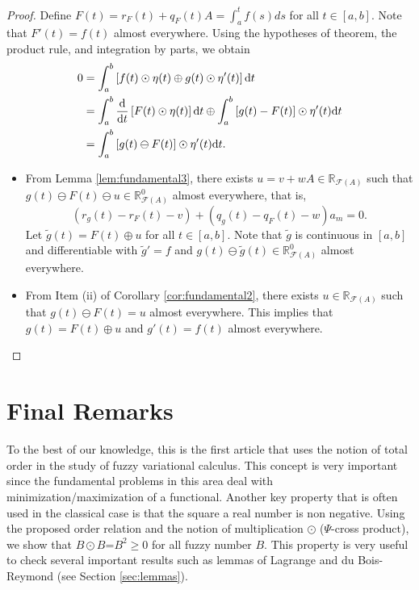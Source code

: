 \documentclass[12pt,a4paper]{article}
\newcommand{\RFA}{\mathbb{R}_{\mathcal{F}(A)}}
\begin{document}
\begin{proof}
Define $F(t) = r_F(t) + q_F(t)A = \int_a^t f(s)ds$ for all $t \in [a,b].$  
Note that $F'(t)=f(t)$ almost everywhere. Using the hypotheses of theorem, the product rule, and integration by parts, we obtain 
\begin{align*}
0&=\int_{a}^{b}\left[f(t)\odot\eta(t) \oplus g(t) \odot \eta'(t)\right]\textnormal{d}t\\
&=\int_{a}^{b}\dfrac{\textnormal{d}}{\textnormal{d}t}\left[F(t)\odot\eta(t)\right]\textnormal{d}t \oplus \int_{a}^{b}\left[g(t)-F(t)\right]\odot\eta'(t)\textnormal{d}t \\
&=\int_{a}^{b}\left[g(t) \ominus F(t)\right]\odot\eta'(t)\textnormal{d}t.	
\end{align*}

\begin{itemize}
\item[(i)] From Lemma \ref{lem:fundamental3}, there exists $u =v+wA\in \RFA$ such that 
$g(t)\ominus F(t) \ominus u \in \RFA^0$ almost everywhere, that is, 
$$
(r_g(t) - r_F(t) - v) + (q_g(t) - q_F(t) - w)a_m = 0.
$$
Let $\tilde{g}(t) = F(t) \oplus u$ for all $t \in [a,b]$. Note that $\tilde{g}$ is continuous in $[a,b]$  and differentiable with $\tilde{g}' = f$ and $g(t) \ominus \tilde{g}(t) \in \RFA^0$ almost everywhere.


\item[(ii)] From Item (ii) of Corollary \ref{cor:fundamental2}, there exists $u \in \RFA$ such that 
$g(t) \ominus F(t) = u$ almost everywhere. 
This implies that $g(t) = F(t) \oplus u$ and $g'(t) = f(t)$ almost everywhere.
\end{itemize}
\end{proof}



\section{Final Remarks}

To the best of our knowledge, this is the first article that uses the notion of total order in the study of fuzzy variational  calculus. This concept is very important since the fundamental problems in this area deal with minimization/maximization of a functional. Another key property that is often used in the classical case is that the square a real number is non negative. %
Using the proposed order relation and the notion of multiplication $\odot$ ($\Psi$-cross product), we show that $B\odot B$=$B^2\geq 0$ for all fuzzy number $B$. This property is very useful to check several important results such as lemmas of Lagrange and du Bois-Reymond (see Section \ref{sec:lemmas}). 
\end{document}
